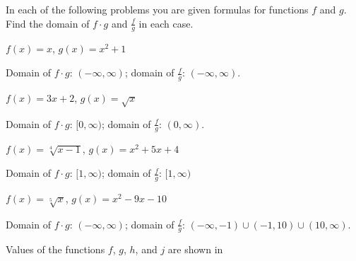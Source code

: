 \begin{exercises}
\begin{problem}
In each of the following problems you are given formulas for 
functions $f$ and $g$. Find the domain of $f\cdot g$ and 
$\frac{f}{g}$ in each case.
\begin{multicols}{2}
	\begin{subproblem}
		$f(x)=x$, $g(x)=x^2+1$ 
		\begin{shortsolution}
			Domain of $f\cdot g$: $(-\infty,\infty)$; domain of $\frac{f}{g}$: $(-\infty,\infty)$.  
		\end{shortsolution}
	\end{subproblem}
	\begin{subproblem}
		$f(x)=3x+2$, $g(x)=\sqrt{x}$  
		\begin{shortsolution}
			Domain of $f\cdot g$: $[0,\infty)$; domain of $\frac{f}{g}$: $(0,\infty)$.
		\end{shortsolution}
	\end{subproblem}
	\begin{subproblem}
		$f(x)=\sqrt[4]{x-1}$, $g(x)=x^2+5x+4$  
		\begin{shortsolution}
			Domain of $f\cdot g$: $[1,\infty)$; domain of $\frac{f}{g}$: $[1,\infty)$  
		\end{shortsolution}
	\end{subproblem}
	\begin{subproblem}
		$f(x)=\sqrt[5]{x}$, $g(x)=x^2-9x-10$  
		\begin{shortsolution}
			Domain of $f\cdot g$: $(-\infty,\infty)$; domain of $\frac{f}{g}$: $(-\infty,-1)\cup (-1,10)\cup (10,\infty)$. 
		\end{shortsolution}
	\end{subproblem}
\end{multicols}
\end{problem}
\begin{problem}\label{fun:prob:combine}
Values of the functions $f$, $g$, $h$, and $j$ are shown in 


\end{problem}
\end{exercises}
